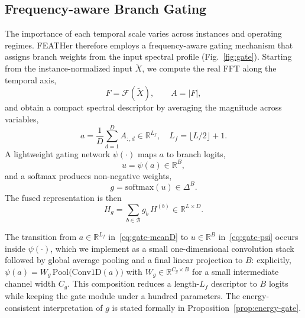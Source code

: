 \documentclass[journal]{IEEEtran}
\theoremstyle{remark}
\begin{document}
\subsection{Frequency-aware Branch Gating}
\label{subsec:gate}
The importance of each temporal scale varies across instances and
operating regimes. FEATHer therefore employs a frequency-aware
gating mechanism that assigns branch weights from the input spectral
profile (Fig.~\ref{fig:gate}). Starting from the instance-normalized
input $\widetilde X$, we compute the real FFT along the temporal
axis,
\begin{equation}
\label{eq:gate-fft}
F = \mathcal{F}(\widetilde X), \qquad A = |F|,
\end{equation}
and obtain a compact spectral descriptor by averaging the magnitude
across variables,
\begin{equation}
\label{eq:gate-meanD}
a = \frac{1}{D} \sum_{d=1}^{D} A_{:,d} \in \mathbb{R}^{L_f},
\quad L_f = \lfloor L/2 \rfloor + 1.
\end{equation}
A lightweight gating network $\psi(\cdot)$ maps $a$ to branch
logits,
\begin{equation}
\label{eq:gate-psi}
u = \psi(a) \in \mathbb{R}^{B},
\end{equation}
and a softmax produces non-negative weights,
\begin{equation}
\label{eq:gate-softmax}
g = \mathrm{softmax}(u) \in \Delta^{B}.
\end{equation}
The fused representation is then
\begin{equation}
\label{eq:gate-fuse}
H_g = \sum_{b \in \mathcal{B}} g_b\, H^{(b)} \in \mathbb{R}^{L \times D}.
\end{equation}

The transition from
$a \in \mathbb{R}^{L_f}$ in~\eqref{eq:gate-meanD} to
$u \in \mathbb{R}^{B}$ in~\eqref{eq:gate-psi} occurs inside
$\psi(\cdot)$, which we implement as a small one-dimensional
convolution stack followed by global average pooling and a final
linear projection to $B$: explicitly, $\psi(a) = W_g\,
\mathrm{Pool}\!\bigl(\mathrm{Conv1D}(a)\bigr)$ with
$W_g \in \mathbb{R}^{C_g \times B}$ for a small intermediate channel
width $C_g$. This composition reduces a length-$L_f$ descriptor to
$B$ logits while keeping the gate module under a hundred parameters.
The energy-consistent interpretation of $g$ is stated formally in
Proposition~\ref{prop:energy-gate}.
\end{document}
